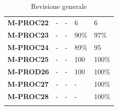 \begin{longtable} {						
		>{}p{30mm}  		
		>{}p{15mm}		
		>{}p{15mm}		
		>{}p{15mm}		
		>{}p{15mm}						
	}
	\textbf{M-PROC22} & - & - & 6 & 6 \TBstrut \\ [2mm]
	\textbf{M-PROC23} & - & - & 90\% & 97\% \TBstrut \\ [2mm]
	\textbf{M-PROC24} & - & - & 89\% & 95 \TBstrut \\ [2mm]
	\textbf{M-PROC25} & - & - & 100 & 100\% \TBstrut \\ [2mm]
	\textbf{M-PROD26} & - & - & 100 & 100\% \TBstrut \\ [2mm]
	\textbf{M-PROC27} & - & - & - & 100\% \TBstrut \\ [2mm]
	\textbf{M-PROC28} & - & - & - & 100\% \TBstrut \\ [2mm]
	\rowcolor{white}
	\caption{Revisione generale}
\end{longtable}
